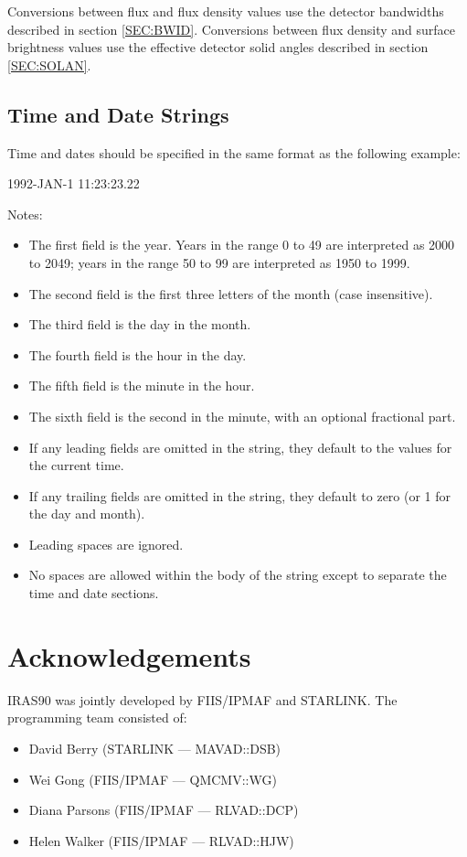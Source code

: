 \documentclass[11pt,nolof,noabs]{starlink}
\begin{document}
Conversions between flux and flux density  values use the detector bandwidths
described in section \ref{SEC:BWID}. Conversions between flux density and
surface brightness  values use the effective detector solid angles described in
section \ref{SEC:SOLAN}.

\subsection{Time and Date Strings}
\label{SEC:TIM}
Time and dates should be specified in the same format as the
following example:

\small
\begin{terminalv}
1992-JAN-1 11:23:23.22
\end{terminalv}
\normalsize

Notes:
\begin{itemize}
\item The first field is the year. Years in the range 0 to 49
     are interpreted as 2000 to 2049; years in the range 50
     to 99 are interpreted as 1950 to 1999.
\item The second field is the first three letters of the month
     (case insensitive).
\item The third field is the day in the month.
\item The fourth field is the hour in the day.
\item The fifth field is the minute in the hour.
\item The sixth field is the second in the minute, with an
     optional fractional part.
\item If any leading fields are omitted in the string, they
     default to the values for the current time.
\item If any trailing fields are omitted in the string, they
     default to zero (or 1 for the day and month).
\item Leading spaces are ignored.
\item No spaces are allowed within the body of the string except
     to separate the time and date sections.
\end{itemize}

\section{Acknowledgements}
{\small IRAS90} was jointly developed by {\small FIIS/IPMAF} and
{\small STARLINK}. The programming team consisted of:
\begin{itemize}
\item David Berry (STARLINK --- MAVAD::DSB)
\item Wei Gong (FIIS/IPMAF --- QMCMV::WG)
\item Diana Parsons (FIIS/IPMAF --- RLVAD::DCP)
\item Helen Walker (FIIS/IPMAF --- RLVAD::HJW)
\end{itemize}
\end{document}

